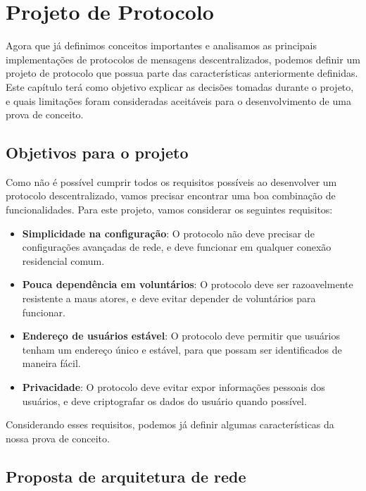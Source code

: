 
\chapter{Projeto de Protocolo}

Agora que já definimos conceitos importantes e analisamos as principais implementações de protocolos de mensagens descentralizados, podemos definir um projeto de protocolo que possua parte das características anteriormente definidas. Este capítulo terá como objetivo explicar as decisões tomadas durante o projeto, e quais limitações foram consideradas aceitáveis para o desenvolvimento de uma prova de conceito.

\section{Objetivos para o projeto}

Como não é possível cumprir todos os requisitos possíveis ao desenvolver um protocolo descentralizado, vamos precisar encontrar uma boa combinação de funcionalidades. Para este projeto, vamos considerar os seguintes requisitos:

\begin{itemize}
    \item \textbf{Simplicidade na configuração}: O protocolo não deve precisar de configurações avançadas de rede, e deve funcionar em qualquer conexão residencial comum.
    \item \textbf{Pouca dependência em voluntários}: O protocolo deve ser razoavelmente resistente a maus atores, e deve evitar depender de voluntários para funcionar.
    \item \textbf{Endereço de usuários estável}: O protocolo deve permitir que usuários tenham um endereço único e estável, para que possam ser identificados de maneira fácil.
    \item \textbf{Privacidade}: O protocolo deve evitar expor informações pessoais dos usuários, e deve criptografar os dados do usuário quando possível.
\end{itemize}

Considerando esses requisitos, podemos já definir algumas características da nossa prova de conceito. 

\section{Proposta de arquitetura de rede}


